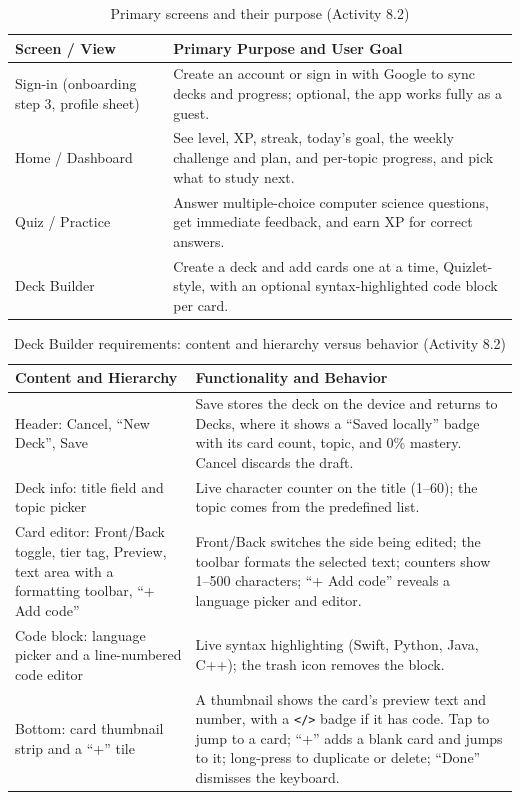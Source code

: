 \documentclass[12pt,letterpaper]{article}
\begin{document}
\begin{table}[H]
\centering
\caption{Primary screens and their purpose (Activity 8.2)}
\label{tab:screens}
\begin{tabularx}{\textwidth}{@{}L{3.4cm} Y@{}}
\toprule
\textbf{Screen / View} & \textbf{Primary Purpose and User Goal} \\
\midrule
Sign-in (onboarding step 3, profile sheet) & Create an account or sign in with Google to sync decks and progress; optional, the app works fully as a guest. \\
Home / Dashboard & See level, XP, streak, today's goal, the weekly challenge and plan, and per-topic progress, and pick what to study next. \\
Quiz / Practice & Answer multiple-choice computer science questions, get immediate feedback, and earn XP for correct answers. \\
Deck Builder & Create a deck and add cards one at a time, Quizlet-style, with an optional syntax-highlighted code block per card. \\
\bottomrule
\end{tabularx}
\end{table}

\begin{table}[H]
\centering
\caption{Deck Builder requirements: content and hierarchy versus behavior (Activity 8.2)}
\label{tab:builderreq}
\begin{tabularx}{\textwidth}{@{}Y Y@{}}
\toprule
\textbf{Content and Hierarchy} & \textbf{Functionality and Behavior} \\
\midrule
Header: Cancel, ``New Deck'', Save & Save stores the deck on the device and returns to Decks, where it shows a ``Saved locally'' badge with its card count, topic, and 0\% mastery. Cancel discards the draft. \\
Deck info: title field and topic picker & Live character counter on the title (1--60); the topic comes from the predefined list. \\
Card editor: Front/Back toggle, tier tag, Preview, text area with a formatting toolbar, ``+ Add code'' & Front/Back switches the side being edited; the toolbar formats the selected text; counters show 1--500 characters; ``+ Add code'' reveals a language picker and editor. \\
Code block: language picker and a line-numbered code editor & Live syntax highlighting (Swift, Python, Java, C++); the trash icon removes the block. \\
Bottom: card thumbnail strip and a ``+'' tile & A thumbnail shows the card's preview text and number, with a \texttt{</>} badge if it has code. Tap to jump to a card; ``+'' adds a blank card and jumps to it; long-press to duplicate or delete; ``Done'' dismisses the keyboard. \\
\bottomrule
\end{tabularx}
\end{table}
\end{document}
